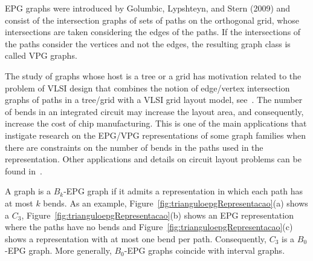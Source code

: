 \documentclass[12pt]{article}
\begin{document}
EPG graphs were introduced by Golumbic, Lypshteyn, and Stern (2009) and consist of the intersection graphs of sets of paths on the orthogonal grid, whose intersections are taken considering the edges of the paths. If the intersections of the paths consider the vertices and not the edges, the resulting graph class is called VPG graphs. %


The study of graphs whose host is a tree or a grid has motivation related to the problem of VLSI design that combines the notion of edge/vertex intersection graphs of paths in a  tree/grid with a  VLSI  grid layout model, see~\cite{golumbic2009}. The number of bends in an integrated circuit may increase the layout area, and consequently, increase the cost of chip manufacturing.
This is one of the main applications that instigate research on the EPG/VPG representations of some graph families when there are constraints on the number of bends in the paths used in the representation.
Other applications and details on circuit layout problems can be found in~\cite{bandy1990, molitor1991}.

A graph is a $ B_k$-EPG graph if it admits a representation in which each path has at most $k$ bends. As an example, Figure~\ref{fig:trianguloepgRepresentacao}(a) shows a $C_3$, Figure~\ref{fig:trianguloepgRepresentacao}(b) shows an EPG representation where the paths have no bends and Figure~\ref{fig:trianguloepgRepresentacao}(c) shows a representation with at most one bend per path.   
Consequently, $C_3$ is a $B_0$-EPG graph. More generally, $B_0$-EPG graphs coincide with interval graphs.
\end{document}
